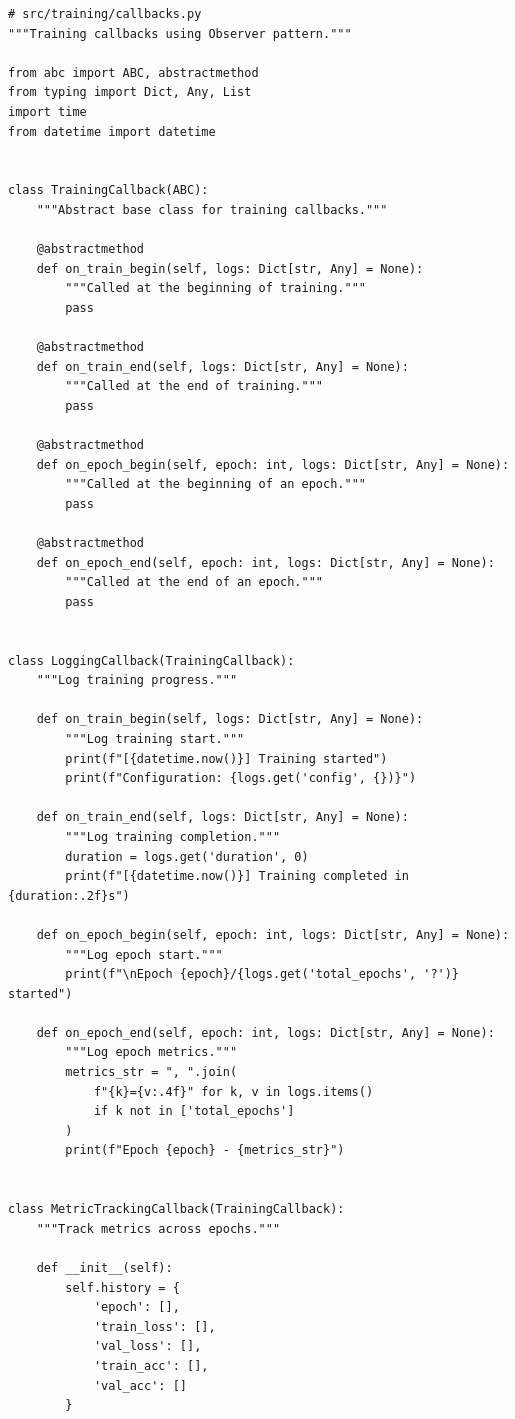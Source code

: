 \begin{lstlisting}[style=python, caption=Observer pattern for monitoring training]
# src/training/callbacks.py
"""Training callbacks using Observer pattern."""

from abc import ABC, abstractmethod
from typing import Dict, Any, List
import time
from datetime import datetime


class TrainingCallback(ABC):
    """Abstract base class for training callbacks."""

    @abstractmethod
    def on_train_begin(self, logs: Dict[str, Any] = None):
        """Called at the beginning of training."""
        pass

    @abstractmethod
    def on_train_end(self, logs: Dict[str, Any] = None):
        """Called at the end of training."""
        pass

    @abstractmethod
    def on_epoch_begin(self, epoch: int, logs: Dict[str, Any] = None):
        """Called at the beginning of an epoch."""
        pass

    @abstractmethod
    def on_epoch_end(self, epoch: int, logs: Dict[str, Any] = None):
        """Called at the end of an epoch."""
        pass


class LoggingCallback(TrainingCallback):
    """Log training progress."""

    def on_train_begin(self, logs: Dict[str, Any] = None):
        """Log training start."""
        print(f"[{datetime.now()}] Training started")
        print(f"Configuration: {logs.get('config', {})}")

    def on_train_end(self, logs: Dict[str, Any] = None):
        """Log training completion."""
        duration = logs.get('duration', 0)
        print(f"[{datetime.now()}] Training completed in {duration:.2f}s")

    def on_epoch_begin(self, epoch: int, logs: Dict[str, Any] = None):
        """Log epoch start."""
        print(f"\nEpoch {epoch}/{logs.get('total_epochs', '?')} started")

    def on_epoch_end(self, epoch: int, logs: Dict[str, Any] = None):
        """Log epoch metrics."""
        metrics_str = ", ".join(
            f"{k}={v:.4f}" for k, v in logs.items()
            if k not in ['total_epochs']
        )
        print(f"Epoch {epoch} - {metrics_str}")


class MetricTrackingCallback(TrainingCallback):
    """Track metrics across epochs."""

    def __init__(self):
        self.history = {
            'epoch': [],
            'train_loss': [],
            'val_loss': [],
            'train_acc': [],
            'val_acc': []
        }


\end{lstlisting}
